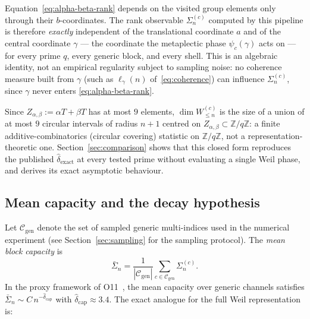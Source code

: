     \begin{remark}
      \label{rem:blind}
      Equation~\eqref{eq:alpha-beta-rank} depends on the visited group elements only through
      their $b$-coordinates.
      The rank observable $\Sigma_n^{(c)}$ computed by this pipeline is therefore
      \emph{exactly} independent of the translational coordinate $a$ and of the central
      coordinate $\gamma$ — the coordinate the metaplectic phase $\psi_c(\gamma)$ acts on —
      for every prime $q$, every generic block, and every shell.
      This is an algebraic identity, not an empirical regularity subject to sampling noise:
      no coherence measure built from $\gamma$ (such as $\ell_\gamma(n)$
      of~\eqref{eq:coherence}) can influence $\Sigma_n^{(c)}$, since $\gamma$ never enters
      \eqref{eq:alpha-beta-rank}.
    \end{remark}

    Since $Z_{\alpha,\beta}:=\alpha T+\beta T$ has at most $9$ elements, $\dim W_{\leq n}^{(c)}$
    is the size of a union of at most $9$ circular intervals of radius $n+1$ centred on
    $Z_{\alpha,\beta}\subset\mathbb{Z}/q\mathbb{Z}$: a finite additive-combinatorics (circular
    covering) statistic on $\mathbb{Z}/q\mathbb{Z}$, not a representation-theoretic one.
    Section~\ref{sec:comparison} shows that this closed form reproduces the published
    $\hat\delta_{\mathrm{exact}}$ at every tested prime without evaluating a single Weil
    phase, and derives its exact asymptotic behaviour.

  \subsection{Mean capacity and the decay hypothesis}

    Let $\mathcal{C}_{\mathrm{gen}}$ denote the set of sampled generic multi-indices
    used in the numerical experiment (see Section~\ref{sec:sampling} for the sampling protocol).
    The \emph{mean block capacity} is
    \begin{equation}
      \bar{\Sigma}_n = \frac{1}{|\mathcal{C}_{\mathrm{gen}}|}
      \sum_{c\in\mathcal{C}_{\mathrm{gen}}} \Sigma_n^{(c)}.
    \end{equation}
    In the proxy framework of O11~\cite{Beau2026a15}, the mean capacity over generic channels
    satisfies $\bar{\Sigma}_n\sim C\,n^{-\hat{\delta}_{\mathrm{cap}}}$ with
    $\hat{\delta}_{\mathrm{cap}}\approx 3.4$.
    The exact analogue for the full Weil representation is:

